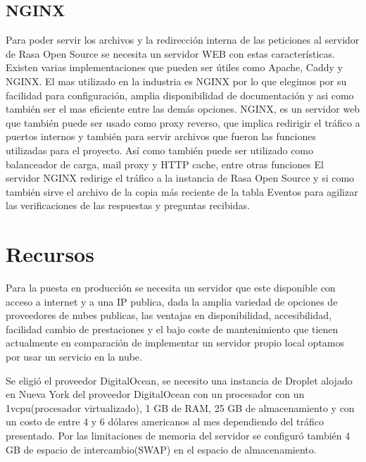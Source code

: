 \subsection{NGINX}
Para poder servir los archivos y la redirección interna de  las peticiones al servidor de Rasa Open
Source se necesita un servidor WEB con estas características. Existen  varias implementaciones que
pueden ser útiles como Apache, Caddy y NGINX. El mas utilizado en la industria es NGINX por lo que
elegimos por su facilidad para configuración, amplia disponibilidad de documentación y asi como
también ser el mas eficiente entre las demás opciones. \cite{web_servers}
NGINX, es un servidor web que también puede ser usado como proxy reverso, que implica redirigir el
tráfico a puertos internos y también para servir archivos que fueron las funciones utilizadas para
el proyecto. Así como también puede ser utilizado como balanceador de carga, mail proxy y HTTP
cache, entre otras funciones \cite{NGINX}
El servidor NGINX redirige el tráfico a la instancia de Rasa Open Source y si como también sirve el
archivo de
la copia más reciente de la tabla Eventos para agilizar las verificaciones de las respuestas y
preguntas recibidas.

\section{Recursos}
Para la puesta en producción se necesita un servidor que este disponible con acceso a internet y a
una IP publica, dada la amplia variedad de opciones de proveedores de nubes publicas, las ventajas
en disponibilidad, accesibilidad, facilidad cambio de prestaciones y el bajo
coste de mantenimiento que tienen actualmente en comparación de implementar un servidor propio
local optamos por usar un servicio en la nube. \cite{cloud_providers}

Se eligió el proveedor DigitalOcean, se necesito una instancia de Droplet alojado en Nueva
York del proveedor DigitalOcean con un procesador con un 1vcpu(procesador virtualizado), 1 GB de
RAM, 25 GB de almacenamiento y con un costo de entre 4 y 6 dólares americanos al mes dependiendo
del tráfico presentado. Por las limitaciones de memoria del servidor se configuró también 4 GB de
espacio de intercambio(SWAP) en el espacio de almacenamiento.

